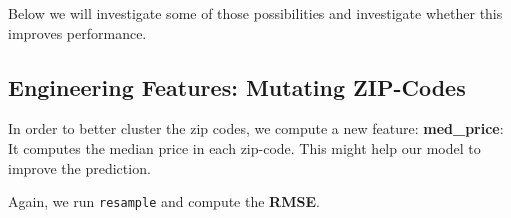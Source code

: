 \documentclass[12pt,]{scrbook}
\newenvironment{Shaded}{}{}
\newcommand{\CommentTok}[1]{\textcolor[rgb]{0.00,0.50,0.00}{#1}}
\newcommand{\DataTypeTok}[1]{#1}
\newcommand{\KeywordTok}[1]{\textcolor[rgb]{0.00,0.00,1.00}{#1}}
\newcommand{\NormalTok}[1]{#1}
\newcommand{\OperatorTok}[1]{#1}
\newcommand{\StringTok}[1]{\textcolor[rgb]{0.00,0.50,0.50}{#1}}
\begin{document}
Below we will investigate some of those possibilities and investigate whether this improves performance.

\hypertarget{engineering-features-mutating-zip-codes}{%
\subsection{Engineering Features: Mutating ZIP-Codes}\label{engineering-features-mutating-zip-codes}}

In order to better cluster the zip codes, we compute a new feature: \textbf{med\_price}:
It computes the median price in each zip-code.
This might help our model to improve the prediction.

\begin{Shaded}
\end{Shaded}

Again, we run \texttt{resample} and compute the \textbf{RMSE}.
\end{document}
